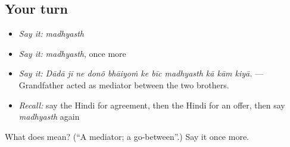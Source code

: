 \subsection*{Your turn}
\begin{itemize}
\raggedright
  \item \emph{Say it:} \emph{madhyasth}
  \item \emph{Say it:} \emph{madhyasth}, once more
  \item \emph{Say it:} \emph{Dādā jī ne donõ bhāiyoṁ ke bīc madhyasth kā kām kiyā.} — Grandfather acted as mediator between the two brothers.
  \item \emph{Recall:} say the Hindi for agreement, then the Hindi for an offer, then say \emph{madhyasth} again
\end{itemize}

\begin{tcolorbox}[breakable,colback=teal!4,colframe=teal!35!black,title={Before you move on}]
What does  mean? (\textquotedblleft{}A mediator; a go-between\textquotedblright{}.) Say it once more.
\end{tcolorbox}

